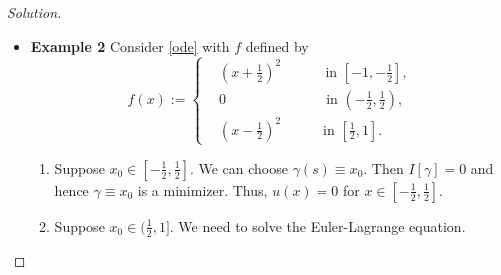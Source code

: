\documentclass[english,reqno]{amsart}
\newenvironment{solution}
  {\renewcommand\qedsymbol{$\blacksquare$}\begin{proof}[Solution]}
  {\end{proof}}
\begin{document}
\begin{enumerate}[label=\arabic*)]
\begin{solution}
\begin{itemize}
    \item \textbf{Example 2}
    Consider \eqref{ode} with $f$ defined by
\begin{equation*}
        f(x) := \left\{
  \begin{aligned}
  &\left(x+\frac{1}{2}\right)^2   \, \quad \qquad \text{in } \left[-1, -\frac{1}{2}\right], \\
   &0 \, \qquad \qquad \qquad \quad \text{in } \left(-\frac{1}{2}, \frac{1}{2}\right), \\
              &\left(x-\frac{1}{2}\right)^2  \qquad  \quad \text{in } \left[\frac{1}{2}, 1\right].
  \end{aligned}
\right.
    \end{equation*}
    
\begin{enumerate}
    \item Suppose $x_0 \in [-\frac{1}{2}, \frac{1}{2}]$. We can choose $\gamma (s) \equiv x_0$. Then $I[\gamma]=0$ and hence $\gamma \equiv x_0$ is a minimizer. Thus, $u(x)=0$ for $x \in [-\frac{1}{2}, \frac{1}{2}]$.
    \item Suppose $x_0 \in (\frac{1}{2}, 1]$. We need to solve the Euler-Lagrange equation.
    

\end{enumerate}
\end{itemize}
\end{solution}
\end{enumerate}
\end{document}
